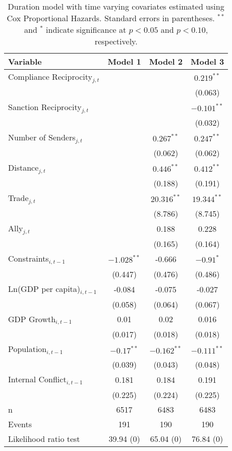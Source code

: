 \begin{table}[ht]
\centering
{\normalsize
\begin{tabular}{lccc}
 Variable & Model 1 & Model 2 & Model 3 \\ 
  \hline
\hline
Compliance Reciprocity$_{j,t}$ &  &  & $0.219^{\ast\ast}$ \\ 
   &  &  & (0.063) \\ 
  Sanction Reciprocity$_{j,t}$ &  &  & $-0.101^{\ast\ast}$ \\ 
   &  &  & (0.032) \\ 
   \hline
Number of Senders$_{j,t}$ &  & $0.267^{\ast\ast}$ & $0.247^{\ast\ast}$ \\ 
   &  & (0.062) & (0.062) \\ 
  Distance$_{j,t}$ &  & $0.446^{\ast\ast}$ & $0.412^{\ast\ast}$ \\ 
   &  & (0.188) & (0.191) \\ 
  Trade$_{j,t}$ &  & $20.316^{\ast\ast}$ & $19.344^{\ast\ast}$ \\ 
   &  & (8.786) & (8.745) \\ 
  Ally$_{j,t}$ &  & 0.188 & 0.228 \\ 
   &  & (0.165) & (0.164) \\ 
   \hline
Constraints$_{i,t-1}$ & $-1.028^{\ast\ast}$ & -0.666 & $-0.91^{\ast}$ \\ 
   & (0.447) & (0.476) & (0.486) \\ 
  Ln(GDP per capita)$_{i,t-1}$ & -0.084 & -0.075 & -0.027 \\ 
   & (0.058) & (0.064) & (0.067) \\ 
  GDP Growth$_{i,t-1}$ & 0.01 & 0.02 & 0.016 \\ 
   & (0.017) & (0.018) & (0.018) \\ 
  Population$_{i,t-1}$ & $-0.17^{\ast\ast}$ & $-0.162^{\ast\ast}$ & $-0.111^{\ast\ast}$ \\ 
   & (0.039) & (0.043) & (0.048) \\ 
  Internal Conflict$_{i,t-1}$ & 0.181 & 0.184 & 0.191 \\ 
   & (0.225) & (0.224) & (0.225) \\ 
   \hline
n & 6517 & 6483 & 6483 \\ 
  Events & 191 & 190 & 190 \\ 
  Likelihood ratio test & 39.94 (0) & 65.04 (0) & 76.84 (0) \\ 
   \hline
\hline
\end{tabular}
}
\caption{Duration model with time varying covariates estimated using Cox Proportional Hazards. Standard errors in parentheses. $^{**}$ and $^{*}$ indicate significance at $p< 0.05 $ and $p< 0.10 $, respectively.} 
\end{table}
